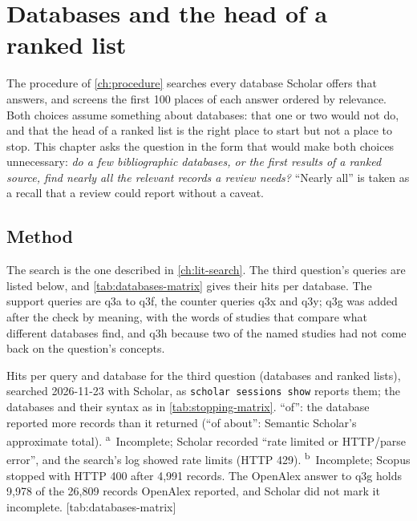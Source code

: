 \chapter{Databases and the head of a ranked list}
\label{ch:databases}


The procedure of \cref{ch:procedure} searches every database Scholar
offers that answers, and screens the first 100 places of each answer ordered by
relevance.
Both choices assume something about databases: that one or two would not
do, and that the head of a ranked list is the right place to start but
not a place to stop.
This chapter asks the question in the form that would make both choices
unnecessary: \emph{do a few bibliographic databases, or the first
results of a ranked source, find nearly all the relevant records a
review needs?}
\enquote{Nearly all} is taken as a recall that a review could report
without a caveat.

\section{Method}
\label{sec:databases-method}

The search is the one described in \cref{ch:lit-search}.
The third question's queries are listed below, and
\cref{tab:databases-matrix} gives their hits per database.
The support queries are q3a to q3f, the counter queries q3x and q3y; q3g
was added after the check by meaning, with the words of studies that
compare what different databases find, and q3h because two of the named
studies had not come back on the question's concepts.


\begin{table}
  \begin{sidecaption}{%
      Hits per query and database for the third question (databases and
      ranked lists), searched 2026-11-23 with Scholar, as \texttt{scholar
      sessions show} reports them; the databases and their syntax as in
      \cref{tab:stopping-matrix}.
      \enquote{of}: the database reported more records than it returned
      (\enquote{of about}: Semantic Scholar's approximate total).
      \textsuperscript{a}~Incomplete; Scholar recorded \enquote{rate
      limited or HTTP/parse error}, and the search's log showed rate
      limits (HTTP 429).
      \textsuperscript{b}~Incomplete; Scopus stopped with HTTP 400 after
      4,991 records.
      The OpenAlex answer to q3g holds 9,978 of the 26,809 records
      OpenAlex reported, and Scholar did not mark it incomplete.
    }[tab:databases-matrix]
    \footnotesize
    
  \end{sidecaption}
\end{table}

